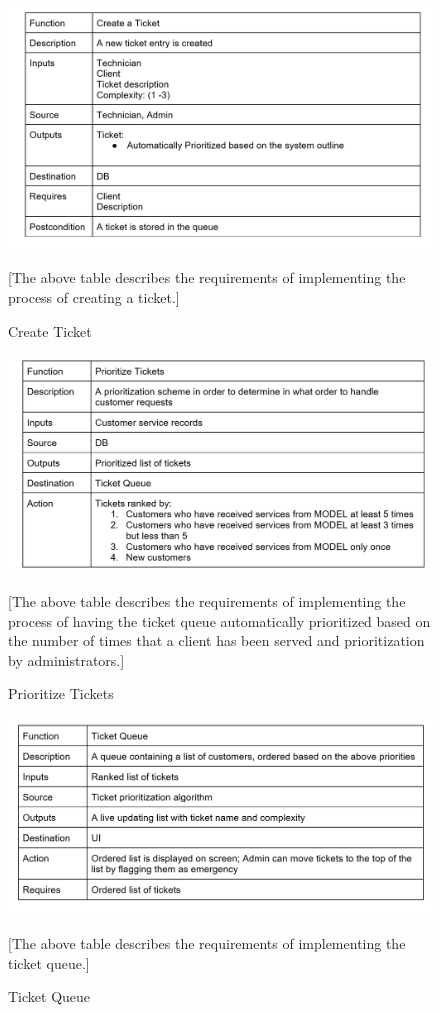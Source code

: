 \documentclass[letterpaper]{article}
\begin{document}
\begin{figure}[htbp]
  \includegraphics[scale = .5]{MakeTicket}
  \caption{Create Ticket}[The above table describes the requirements of implementing the process of creating a ticket.]
  \centering
\end{figure}


\begin{figure}[htbp]
  \includegraphics[scale = .5]{PrioTicket}
  \caption{Prioritize Tickets}[The above table describes the requirements of implementing the process of having the ticket queue automatically prioritized based on the number of times that a client has been served and prioritization by administrators.]
  \centering
\end{figure}

\begin{figure}[htbp]
  \includegraphics[scale = .5]{TicketQueue}
  \caption{Ticket Queue}[The above table describes the requirements of implementing the ticket queue.]
  \centering
\end{figure}
\end{document}

